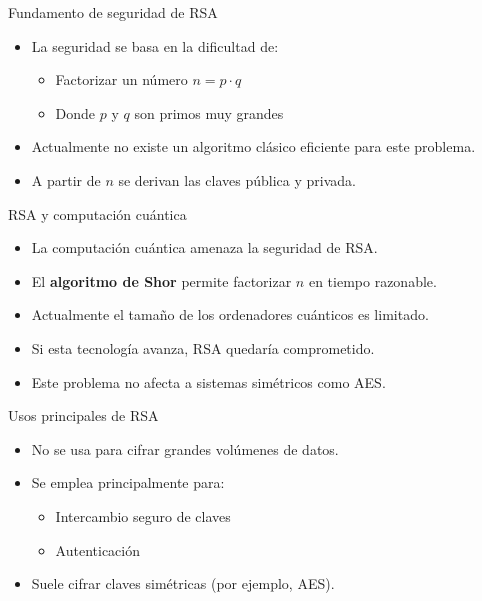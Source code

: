 \documentclass{beamer}
\begin{document}
\begin{frame}{Fundamento de seguridad de RSA}
\begin{itemize}
  \item La seguridad se basa en la dificultad de:
  \begin{itemize}
    \item Factorizar un número $n = p \cdot q$
    \item Donde $p$ y $q$ son primos muy grandes
  \end{itemize}
  \item Actualmente no existe un algoritmo clásico eficiente para este problema.
  \item A partir de $n$ se derivan las claves pública y privada.
\end{itemize}
\end{frame}

\begin{frame}{RSA y computación cuántica}
\begin{itemize}
  \item La computación cuántica amenaza la seguridad de RSA.
  \item El \textbf{algoritmo de Shor} permite factorizar $n$ en tiempo razonable.
  \item Actualmente el tamaño de los ordenadores cuánticos es limitado.
  \item Si esta tecnología avanza, RSA quedaría comprometido.
  \item Este problema no afecta a sistemas simétricos como AES.
\end{itemize}
\end{frame}

\begin{frame}{Usos principales de RSA}
\begin{itemize}
  \item No se usa para cifrar grandes volúmenes de datos.
  \item Se emplea principalmente para:
  \begin{itemize}
    \item Intercambio seguro de claves
    \item Autenticación
  \end{itemize}
  \item Suele cifrar claves simétricas (por ejemplo, AES).
\end{itemize}
\end{frame}
\end{document}

